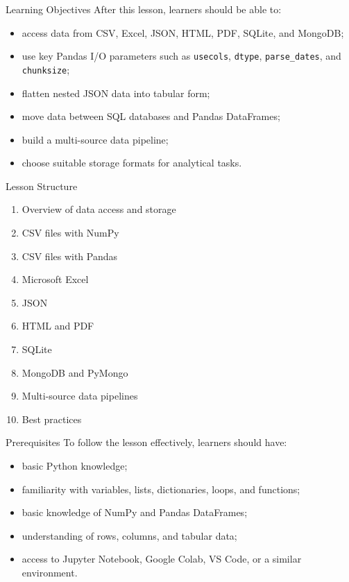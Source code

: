 \documentclass[aspectratio=169,11pt]{beamer}
\newcommand{\code}[1]{\texttt{#1}}
\begin{document}
\begin{frame}{Learning Objectives}
After this lesson, learners should be able to:
\begin{itemize}
  \item access data from CSV, Excel, JSON, HTML, PDF, SQLite, and MongoDB;
  \item use key Pandas I/O parameters such as \code{usecols}, \code{dtype}, \code{parse\_dates}, and \code{chunksize};
  \item flatten nested JSON data into tabular form;
  \item move data between SQL databases and Pandas DataFrames;
  \item build a multi-source data pipeline;
  \item choose suitable storage formats for analytical tasks.
\end{itemize}
\end{frame}

\begin{frame}{Lesson Structure}
\begin{enumerate}
  \item Overview of data access and storage
  \item CSV files with NumPy
  \item CSV files with Pandas
  \item Microsoft Excel
  \item JSON
  \item HTML and PDF
  \item SQLite
  \item MongoDB and PyMongo
  \item Multi-source data pipelines
  \item Best practices
\end{enumerate}
\end{frame}

\begin{frame}{Prerequisites}
To follow the lesson effectively, learners should have:
\begin{itemize}
  \item basic Python knowledge;
  \item familiarity with variables, lists, dictionaries, loops, and functions;
  \item basic knowledge of NumPy and Pandas DataFrames;
  \item understanding of rows, columns, and tabular data;
  \item access to Jupyter Notebook, Google Colab, VS Code, or a similar environment.
\end{itemize}
\end{frame}
\end{document}
